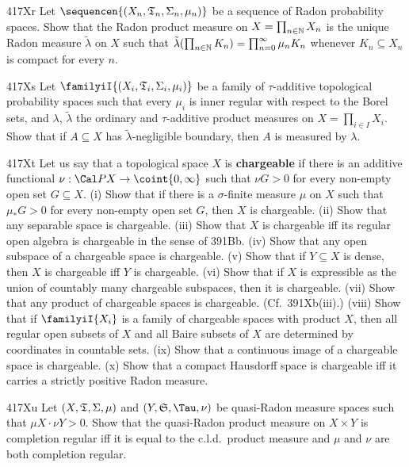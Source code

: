 {\spheader 417Xr Let $\sequencen{(X_n,\frak T_n,\Sigma_n,\mu_n)}$ be a
sequence of Radon probability spaces.   Show that the Radon product
measure on $X=\prod_{n\in\Bbb N}X_n$ is the unique Radon measure
$\tilde\lambda$ on $X$ such that
$\tilde\lambda(\prod_{n\in\Bbb N}K_n)=\prod_{n=0}^{\infty}\mu_nK_n$
whenever $K_n\subseteq X_n$ is compact for every $n$.

\spheader 417Xs Let $\familyiI{(X_i,\frak T_i,\Sigma_i,\mu_i)}$ be a
family of $\tau$-additive topological probability spaces such that every
$\mu_i$ is inner regular with respect to the Borel sets, and $\lambda$,
$\tilde\lambda$ the ordinary and $\tau$-additive product measures on
$X=\prod_{i\in I}X_i$.   Show that if $A\subseteq X$ has
$\tilde\lambda$-negligible boundary, then $A$ is measured by $\lambda$.

\spheader 417Xt Let us say that a topological space $X$ is
{\bf chargeable} if there is an additive functional
$\nu:\Cal PX\to\coint{0,\infty}$ such that $\nu G>0$ for every non-empty
open set $G\subseteq X$.   (i) Show that if there is a
$\sigma$-finite measure $\mu$ on $X$ such that $\mu_*G>0$ for every
non-empty open set $G$, then $X$ is chargeable.     (ii) Show that any separable space is chargeable.   (iii) Show
that $X$ is chargeable iff its regular open algebra is
chargeable in the sense of 391Bb.
   (iv)
Show that any open subspace of a chargeable space is chargeable.   (v)
Show that if $Y\subseteq X$ is dense, then $X$ is chargeable iff $Y$ is
chargeable.   (vi) Show that if $X$ is expressible as the union of
countably many chargeable subspaces, then it is chargeable.   (vii)
Show that any product of chargeable spaces is chargeable.  (Cf.\
391Xb(iii).)
(viii) Show that if $\familyiI{X_i}$ is a family of chargeable spaces
with product $X$, then all regular open subsets of $X$ and all Baire
subsets of $X$ are determined by coordinates in countable sets.
(ix) Show that a continuous image of a chargeable space is chargeable.
(x) Show that a compact Hausdorff space is chargeable
iff it carries a strictly positive Radon measure.   

\spheader 417Xu Let $(X,\frak T,\Sigma,\mu)$ and $(Y,\frak S,\Tau,\nu)$
be quasi-Radon measure spaces such that $\mu X\cdot\nu Y>0$.   Show that
the quasi-Radon product measure on $X\times Y$ is completion regular iff
it is equal to the c.l.d.\ product measure and $\mu$ and $\nu$ are both
completion regular.   

}
